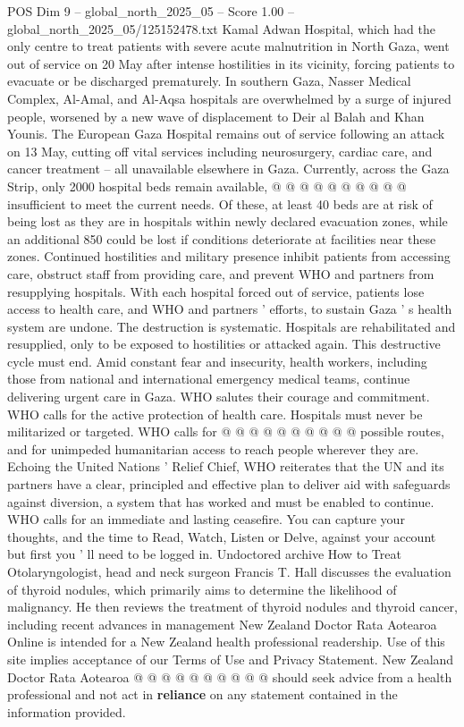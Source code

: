 \begin{textsample}{POS Dim 9 – global\_north\_2025\_05 – Score 1.00 – global\_north\_2025\_05/125152478.txt}
Kamal Adwan Hospital, which had the only centre to treat patients with severe acute malnutrition in North Gaza, went out of service on 20 May after intense hostilities in its vicinity, forcing patients to evacuate or be discharged prematurely.
In southern Gaza, Nasser Medical Complex, Al-Amal, and Al-Aqsa hospitals are overwhelmed by a surge of injured people, worsened by a new wave of displacement to Deir al Balah and Khan Younis.
The European Gaza Hospital remains out of service following an attack on 13 May, cutting off vital services including neurosurgery, cardiac care, and cancer treatment -- all unavailable elsewhere in Gaza.
Currently, across the Gaza Strip, only 2000 hospital beds remain available, @ @ @ @ @ @ @ @ @ @ insufficient to meet the current needs.
Of these, at least 40 beds are at risk of being lost as they are in hospitals within newly declared evacuation zones, while an additional 850 could be lost if conditions deteriorate at facilities near these zones.
Continued hostilities and military presence inhibit patients from accessing care, obstruct staff from providing care, and prevent WHO and partners from resupplying hospitals.
With each hospital forced out of service, patients lose access to health care, and WHO and partners ' efforts, to sustain Gaza ' s health system are undone.
The destruction is systematic.
Hospitals are rehabilitated and resupplied, only to be exposed to hostilities or attacked again.
This destructive cycle must end.
Amid constant fear and insecurity, health workers, including those from national and international emergency medical teams, continue delivering urgent care in Gaza.
WHO salutes their courage and commitment.
WHO calls for the active protection of health care.
Hospitals must never be militarized or targeted.
WHO calls for @ @ @ @ @ @ @ @ @ @ possible routes, and for unimpeded humanitarian access to reach people wherever they are.
Echoing the United Nations ' Relief Chief, WHO reiterates that the UN and its partners have a clear, principled and effective plan to deliver aid with safeguards against diversion, a system that has worked and must be enabled to continue.
WHO calls for an immediate and lasting ceasefire.
You can capture your thoughts, and the time to Read, Watch, Listen or Delve, against your account but first you ' ll need to be logged in.
Undoctored archive How to Treat Otolaryngologist, head and neck surgeon Francis T.
Hall discusses the evaluation of thyroid nodules, which primarily aims to determine the likelihood of malignancy.
He then reviews the treatment of thyroid nodules and thyroid cancer, including recent advances in management New Zealand Doctor Rata Aotearoa Online is intended for a New Zealand health professional readership.
Use of this site implies acceptance of our Terms of Use and Privacy Statement.
New Zealand Doctor Rata Aotearoa @ @ @ @ @ @ @ @ @ @ should seek advice from a health professional and not act in \textbf{reliance} on any statement contained in the information provided.

\end{textsample}
